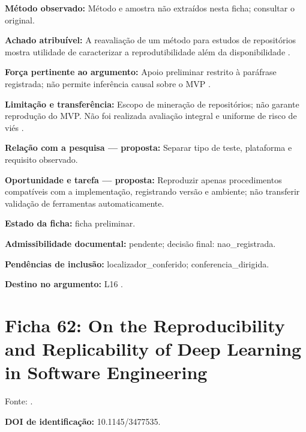 \noindent\textbf{Método observado:} Método e amostra não extraídos nesta ficha; consultar o original.\par\medskip

\noindent\textbf{Achado atribuível:} A reavaliação de um método para estudos de repositórios mostra utilidade de caracterizar a reprodutibilidade além da disponibilidade \citep{eng08}.\par\medskip

\noindent\textbf{Força pertinente ao argumento:} Apoio preliminar restrito à paráfrase registrada; não permite inferência causal sobre o MVP \citep{eng08}.\par\medskip

\noindent\textbf{Limitação e transferência:} Escopo de mineração de repositórios; não garante reprodução do MVP. Não foi realizada avaliação integral e uniforme de risco de viés \citep{eng08}.\par\medskip

\noindent\textbf{Relação com a pesquisa — proposta:} Separar tipo de teste, plataforma e requisito observado.\par\medskip

\noindent\textbf{Oportunidade e tarefa — proposta:} Reproduzir apenas procedimentos compatíveis com a implementação, registrando versão e ambiente; não transferir validação de ferramentas automaticamente.\par\medskip

\noindent\textbf{Estado da ficha:} ficha preliminar.\par\medskip

\noindent\textbf{Admissibilidade documental:} pendente; decisão final: nao\_registrada.\par\medskip

\noindent\textbf{Pendências de inclusão:} localizador\_conferido; conferencia\_dirigida.\par\medskip

\noindent\textbf{Destino no argumento:} L16 .

\clearpage\section*{Ficha 62: On the Reproducibility and Replicability of Deep Learning in Software Engineering}

Fonte: \citet{eng10}.

\noindent\textbf{DOI de identificação:} 10.1145/3477535.\par\medskip

